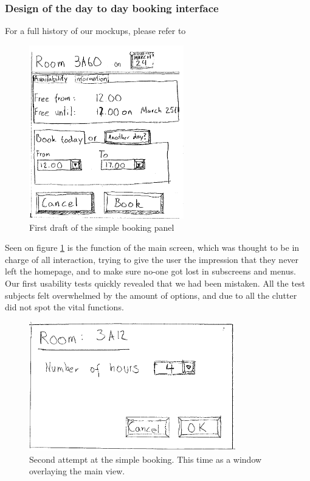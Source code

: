 \subsubsection{Design of the day to day booking interface}
For a full history of our mockups, please refer to %

\begin{figure}[htb]
\begin{center}
\leavevmode
\includegraphics[width=0.6\textwidth]{images/bookRoomMockup}
\end{center}
\caption{First draft of the simple booking panel}
\label{fig:book_room_mockup}
\end{figure}

Seen on figure \ref{fig:book_room_mockup} is the function of the main screen, which was thought to be in charge of all interaction, trying to give the user the impression that they never left the homepage, and to make sure no-one got lost in subscreens and menus. Our first usability tests quickly revealed that we had been mistaken. All the test subjects felt overwhelmed by the amount of options, and due to all the clutter did not spot the vital functions.

\begin{figure}[htb]
\begin{center}
\leavevmode
\includegraphics[width=0.8\textwidth]{images/bookRoomMockup2}
\end{center}
\caption{Second attempt at the simple booking. This time as a window overlaying the main view.}
\label{fig:book_room_mockup2}
\end{figure}

